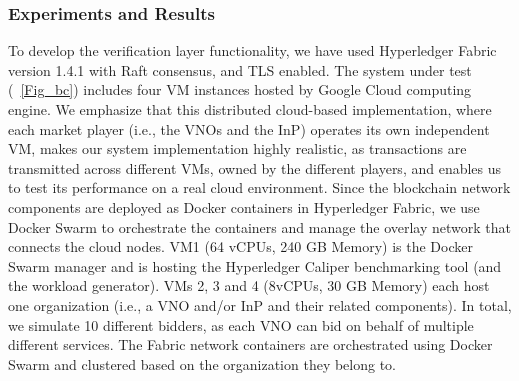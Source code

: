 \subsubsection{Experiments and Results} \label{sec:results}
To develop the verification layer functionality, we have used Hyperledger Fabric version 1.4.1 with Raft consensus, and \ac{TLS} enabled. The system under test (\figureautorefname~\ref{Fig_bc}) includes four \ac{VM} instances hosted by Google Cloud computing engine. We emphasize that this distributed cloud-based implementation, where each market player (i.e., the \acp{VNO} and the \ac{InP}) operates its own independent \ac{VM}, makes our system implementation highly realistic, as transactions are transmitted across different \acp{VM}, owned by the different players, and enables us to test its performance on a real cloud environment. Since the blockchain network components are deployed as Docker containers in Hyperledger Fabric, we use Docker Swarm to orchestrate the containers and manage the overlay network that connects the cloud nodes.
VM1 (64 vCPUs, 240 GB Memory) is the Docker Swarm manager and is hosting the Hyperledger Caliper benchmarking tool (and the workload generator). \acp{VM} 2, 3 and 4 (8vCPUs, 30 GB Memory) each host one organization (i.e., a \ac{VNO} and/or \ac{InP} and their related components). In total, we simulate 10 different bidders, as each \ac{VNO} can bid on behalf of multiple different services. The Fabric network containers are orchestrated using Docker Swarm and clustered based on the organization they belong to. 



